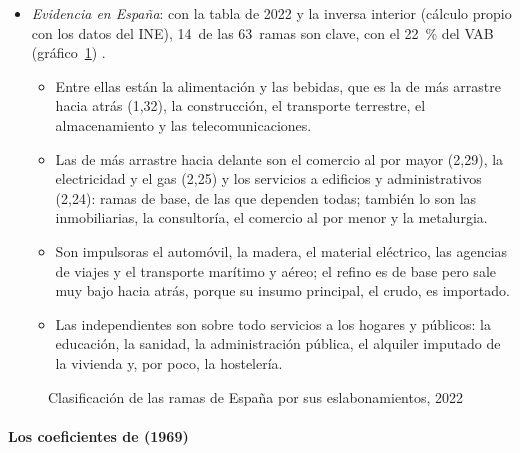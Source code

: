 \documentclass[11pt]{article}
\begin{document}
\begin{itemize}
\item \emph{Evidencia en España}: con la tabla de 2022 y la inversa interior (cálculo propio con los datos del INE), 14~de las 63~ramas son clave, con el 22~\% del VAB (gráfico~\ref{fig:rasmussen-espana})\nocite{INE2025TIODatos} .
  \begin{itemize}
  \item Entre ellas están la alimentación y las bebidas, que es la de más arrastre hacia atrás (1,32), la construcción, el transporte terrestre, el almacenamiento y las telecomunicaciones.
  \item Las de más arrastre hacia delante son el comercio al por mayor (2,29), la electricidad y el gas (2,25) y los servicios a edificios y administrativos (2,24): ramas de base, de las que dependen todas; también lo son las inmobiliarias, la consultoría, el comercio al por menor y la metalurgia.
  \item Son impulsoras el automóvil, la madera, el material eléctrico, las agencias de viajes y el transporte marítimo y aéreo; el refino es de base pero sale muy bajo hacia atrás, porque su insumo principal, el crudo, es importado.
  \item Las independientes son sobre todo servicios a los hogares y públicos: la educación, la sanidad, la administración pública, el alquiler imputado de la vivienda y, por poco, la hostelería.
  \end{itemize}
\end{itemize}

\begin{figure}[H]
\centering
\caption{Clasificación de las ramas de España por sus eslabonamientos, 2022}\label{fig:rasmussen-espana}
\end{figure}

\paragraph{Los coeficientes de  (1969)}
\end{document}
